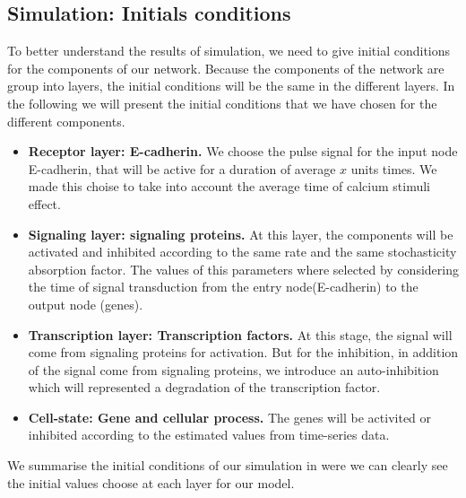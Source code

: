   


\subsection{Simulation: Initials conditions}
To better understand the results of simulation, we need to give initial conditions for the components of our network. Because the components of the network are group into 
layers, the initial conditions will be the same in the different layers. In the following we will present the initial conditions that we have chosen for the different 
components.

\begin{itemize}
 \item \textbf{Receptor layer: E-cadherin.} We choose the  pulse signal for the input node E-cadherin, that will be active for a duration of average $x$ units times. We made this 
 choise to take into account the average time of calcium stimuli effect.
 \item \textbf{Signaling layer: signaling proteins.} At this layer, the components will be activated and inhibited according to the same rate and the same stochasticity absorption factor.
 The values of this parameters where selected by considering the time of signal transduction from the entry node(E-cadherin) to the output node (genes).
 \item \textbf{Transcription layer: Transcription factors.} At this stage, the signal will come from signaling proteins for activation. But for the inhibition, in addition 
 of the signal come from signaling proteins, we introduce an auto-inhibition which will represented a degradation of the transcription factor.
 \item \textbf{Cell-state: Gene and cellular  process.} The genes will be activited or inhibited according to the estimated values from time-series data.
\end{itemize}

We summarise the initial conditions of our simulation in  were we can clearly see the initial values choose at each layer for our model.

